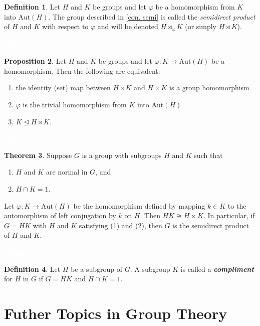 \documentclass{article}
\theoremstyle{definition}
\newtheorem{thm}{Theorem}[section]
\newtheorem{prop}[thm]{Proposition}
\newtheorem{defn}[thm]{Definition}
\newcommand{\nl}{\textcolor{white}{nothing}}
\newcommand{\ra}{\rightarrow}
\newcommand{\vphi}{\varphi}
\newcommand{\Aut}{\text{Aut}}
\begin{document}
\begin{defn}
Let $H$ and $K$ be groups and let $\vphi$ be a homomorphism from $K$ into $\Aut(H)$. The group described in \autoref{con. semi} is called the \textit{semidirect product} of $H$ and $K$ with respect to $\vphi$ and will be denoted $H\rtimes_\vphi K$ (or simply $H\rtimes K$).
\end{defn}

\nl

\begin{prop}
Let $H$ and $K$ be groups and let $\vphi:K\ra \Aut(H)$ be a homomorphism. Then the following are equivalent:
\begin{enumerate}
\item the identity (set) map between $H\rtimes K$ and $H\times K$ is a group homomorphism
\item $\vphi$ is the trivial homomorphism from $K$ into $\Aut(H)$
\item $K\unlhd H\rtimes K$.
\end{enumerate}
\end{prop}

\nl

\begin{thm}
Suppose $G$ is a group with subgroups $H$ and $K$ such that
\begin{enumerate}
\item $H$ and $K$ are normal in $G$, and
\item $H\cap K = 1$.
\end{enumerate}
Let $\vphi:K\ra \Aut(H)$ be the homomorphism defined by mapping $k\in K$ to the automorphism of left conjugation by $k$ on $H$. Then $HK\cong H\times K$. In particular, if $G=HK$ with $H$ and $K$ satisfying (1) and (2), then $G$ is the semidirect product of $H$ and $K$.
\end{thm}

\nl

\begin{defn}
Let $H$ be a subgroup of $G$. A subgroup $K$ is called a \textbf{\textit{compliment}} for $H$ in $G$ if $G = HK$ and $H\cap K = 1$.
\end{defn}


\section{Futher Topics in Group Theory}
\setcounter{thm}{0}
\end{document}
